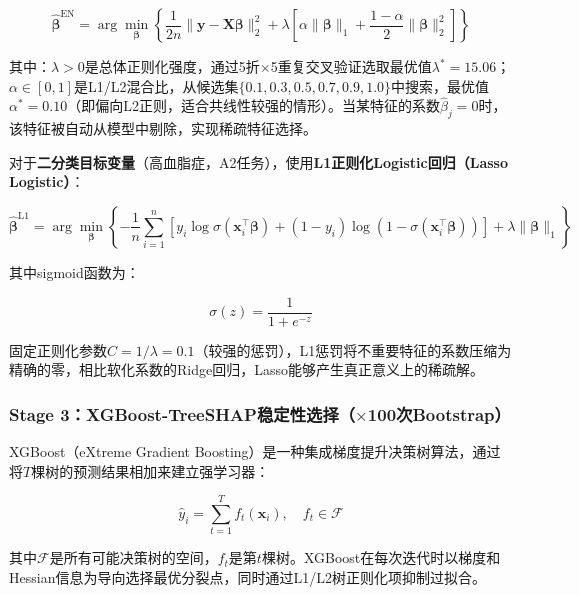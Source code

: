 \documentclass[12pt,a4paper]{ctexart}
\begin{document}
\begin{equation}
\hat{\bm{\beta}}^{\text{EN}} = \arg\min_{\bm{\beta}} \left\{ \frac{1}{2n}\|\mathbf{y} - \mathbf{X}\bm{\beta}\|_2^2 + \lambda\left[\alpha\|\bm{\beta}\|_1 + \frac{1-\alpha}{2}\|\bm{\beta}\|_2^2\right] \right\}
\label{eq:elasticnet}
\end{equation}

其中：$\lambda > 0$是总体正则化强度，通过5折×5重复交叉验证选取最优值$\lambda^* = 15.06$；$\alpha \in [0, 1]$是L1/L2混合比，从候选集$\{0.1, 0.3, 0.5, 0.7, 0.9, 1.0\}$中搜索，最优值$\alpha^* = 0.10$（即偏向L2正则，适合共线性较强的情形）。当某特征的系数$\hat{\beta}_j = 0$时，该特征被自动从模型中剔除，实现稀疏特征选择。

对于\textbf{二分类目标变量}（高血脂症，A2任务），使用\textbf{L1正则化Logistic回归（Lasso Logistic）}：

\begin{equation}
\hat{\bm{\beta}}^{\text{L1}} = \arg\min_{\bm{\beta}} \left\{ -\frac{1}{n}\sum_{i=1}^{n}\left[y_i \log \sigma(\mathbf{x}_i^\top\bm{\beta}) + (1-y_i)\log(1-\sigma(\mathbf{x}_i^\top\bm{\beta}))\right] + \lambda\|\bm{\beta}\|_1 \right\}
\label{eq:lasso_logistic}
\end{equation}

其中sigmoid函数为：

\begin{equation}
\sigma(z) = \frac{1}{1 + e^{-z}}
\label{eq:sigmoid}
\end{equation}

固定正则化参数$C = 1/\lambda = 0.1$（较强的惩罚），L1惩罚将不重要特征的系数压缩为精确的零，相比软化系数的Ridge回归，Lasso能够产生真正意义上的稀疏解。

\subsubsection{Stage 3：XGBoost-TreeSHAP稳定性选择（$\times$100次Bootstrap）}

XGBoost（eXtreme Gradient Boosting）是一种集成梯度提升决策树算法，通过将$T$棵树的预测结果相加来建立强学习器：

\begin{equation}
\hat{y}_i = \sum_{t=1}^{T} f_t(\mathbf{x}_i), \quad f_t \in \mathcal{F}
\label{eq:xgboost}
\end{equation}

其中$\mathcal{F}$是所有可能决策树的空间，$f_t$是第$t$棵树。XGBoost在每次迭代时以梯度和Hessian信息为导向选择最优分裂点，同时通过L1/L2树正则化项抑制过拟合。
\end{document}
